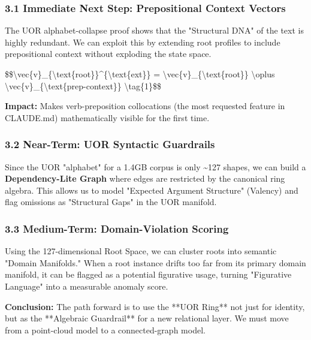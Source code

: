 \documentclass[12pt,a4paper]{article}
\begin{document}
\subsubsection{3.1 Immediate Next Step: Prepositional Context
Vectors}\label{immediate-next-step-prepositional-context-vectors}

The UOR alphabet-collapse proof shows that the "Structural DNA" of the
text is highly redundant. We can exploit this by extending root profiles
to include prepositional context without exploding the state space.

\$\$\textbackslash vec\{v\}\_\{\textbackslash text\{root\}\}\^{}\{\textbackslash text\{ext\}\}
= \textbackslash vec\{v\}\_\{\textbackslash text\{root\}\}
\textbackslash oplus
\textbackslash vec\{v\}\_\{\textbackslash text\{prep-context\}\}
\textbackslash tag\{1\}\$\$

\textbf{Impact:} Makes verb-preposition collocations (the most requested
feature in CLAUDE.md) mathematically visible for the first time.

\subsubsection{3.2 Near-Term: UOR Syntactic
Guardrails}\label{near-term-uor-syntactic-guardrails}

Since the UOR "alphabet" for a 1.4GB corpus is only \textasciitilde127
shapes, we can build a \textbf{Dependency-Lite Graph} where edges are
restricted by the canonical ring algebra. This allows us to model
"Expected Argument Structure" (Valency) and flag omissions as
"Structural Gaps" in the UOR manifold.

\subsubsection{3.3 Medium-Term: Domain-Violation
Scoring}\label{medium-term-domain-violation-scoring}

Using the 127-dimensional Root Space, we can cluster roots into semantic
"Domain Manifolds." When a root instance drifts too far from its primary
domain manifold, it can be flagged as a potential figurative usage,
turning "Figurative Language" into a measurable anomaly score.

\textbf{Conclusion:} The path forward is to use the **UOR Ring** not
just for identity, but as the **Algebraic Guardrail** for a new
relational layer. We must move from a point-cloud model to a
connected-graph model.
\end{document}
